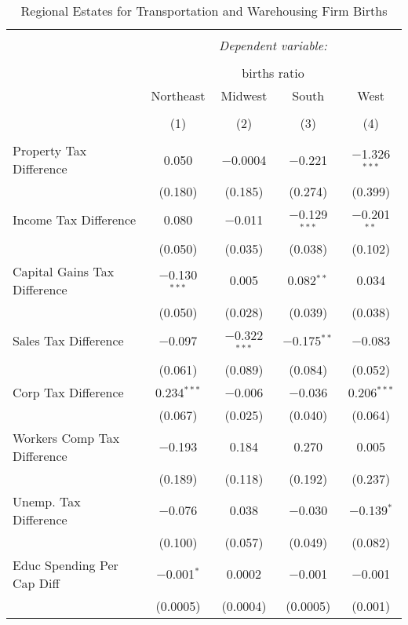 
\begin{table}[!htbp] \centering 
  \caption{Regional Estates for  Transportation and Warehousing Firm Births} 
  \label{} 
\begin{tabular}{@{\extracolsep{5pt}}lcccc} 
\\[-1.8ex]\hline 
\hline \\[-1.8ex] 
 & \multicolumn{4}{c}{\textit{Dependent variable:}} \\ 
\cline{2-5} 
\\[-1.8ex] & \multicolumn{4}{c}{births ratio} \\ 
 & Northeast & Midwest & South & West \\ 
\\[-1.8ex] & (1) & (2) & (3) & (4)\\ 
\hline \\[-1.8ex] 
 Property Tax Difference & 0.050 & $-$0.0004 & $-$0.221 & $-$1.326$^{***}$ \\ 
  & (0.180) & (0.185) & (0.274) & (0.399) \\ 
  Income Tax Difference & 0.080 & $-$0.011 & $-$0.129$^{***}$ & $-$0.201$^{**}$ \\ 
  & (0.050) & (0.035) & (0.038) & (0.102) \\ 
  Capital Gains Tax Difference & $-$0.130$^{***}$ & 0.005 & 0.082$^{**}$ & 0.034 \\ 
  & (0.050) & (0.028) & (0.039) & (0.038) \\ 
  Sales Tax Difference & $-$0.097 & $-$0.322$^{***}$ & $-$0.175$^{**}$ & $-$0.083 \\ 
  & (0.061) & (0.089) & (0.084) & (0.052) \\ 
  Corp Tax Difference & 0.234$^{***}$ & $-$0.006 & $-$0.036 & 0.206$^{***}$ \\ 
  & (0.067) & (0.025) & (0.040) & (0.064) \\ 
  Workers Comp Tax Difference & $-$0.193 & 0.184 & 0.270 & 0.005 \\ 
  & (0.189) & (0.118) & (0.192) & (0.237) \\ 
  Unemp. Tax Difference & $-$0.076 & 0.038 & $-$0.030 & $-$0.139$^{*}$ \\ 
  & (0.100) & (0.057) & (0.049) & (0.082) \\ 
  Educ Spending Per Cap Diff & $-$0.001$^{*}$ & 0.0002 & $-$0.001 & $-$0.001 \\ 
  & (0.0005) & (0.0004) & (0.0005) & (0.001) \\ 

\end{tabular}
\end{table}

